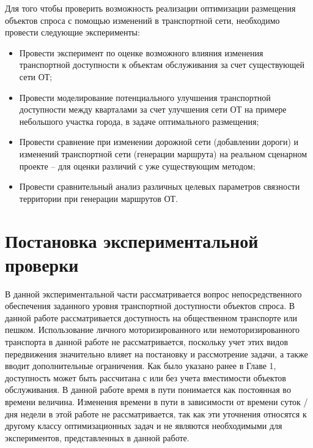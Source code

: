 \label{ch:optimal-placement-local}

Для того чтобы проверить возможность реализации оптимизации размещения объектов спроса с помощью изменений в транспортной сети, необходимо провести следующие эксперименты:

\begin{itemize}
    \item Провести эксперимент по оценке возможного влияния изменения транспортной доступности к объектам обслуживания за счет существующей сети ОТ;
    \item Провести моделирование потенциального улучшения транспортной доступности между кварталами за счет улучшения сети ОТ на примере небольшого участка города, в задаче оптимального размещения;
    \item Провести сравнение при изменении дорожной сети (добавлении дороги) и изменений транспортной сети (генерации маршрута) на реальном сценарном проекте -- для оценки различий с уже существующим методом;
    \item Провести сравнительный анализ различных целевых параметров связности территории при генерации маршрутов ОТ.
\end{itemize}

\section{Постановка экспериментальной проверки}
\label{sec:placement-experiment-setup}

В данной экспериментальной части рассматривается вопрос непосредственного обеспечения заданного уровня транспортной доступности объектов спроса. В данной работе рассматривается доступность на общественном транспорте или пешком. Использование личного моторизированного или немоторизированного транспорта в данной работе не рассматривается, поскольку учет этих видов передвижения значительно влияет на постановку и рассмотрение задачи, а также вводит дополнительные ограничения. Как было указано ранее в Главе 1, доступность может быть рассчитана с или без учета вместимости объектов обслуживания. В данной работе время в пути понимается как постоянная во времени величина. Изменения времени в пути в зависимости от времени суток / дня недели в этой работе не рассматривается, так как эти уточнения относятся к другому классу оптимизационных задач и не являются необходимыми для экспериментов, представленных в данной работе.

